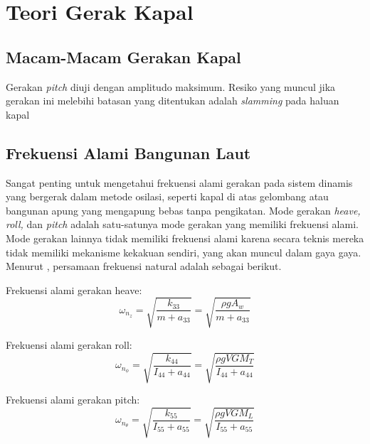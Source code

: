 \section{Teori Gerak Kapal}
\label{sec:teori-gerak-kapal}

\subsection{Macam-Macam Gerakan Kapal}
\label{subsec:macam-gerak-kapal}

Gerakan \emph{pitch} diuji dengan amplitudo maksimum. Resiko yang muncul jika gerakan ini melebihi batasan yang ditentukan adalah \emph{slamming} pada haluan kapal

\subsection{Frekuensi Alami Bangunan Laut}
\label{subsec:frekuensi-alami-kapal}

Sangat penting untuk mengetahui frekuensi alami gerakan pada sistem dinamis yang bergerak dalam metode osilasi, seperti kapal di atas gelombang atau bangunan apung yang mengapung bebas tanpa pengikatan. Mode gerakan \emph{heave, roll,} dan \textit{pitch} adalah satu-satunya mode gerakan yang memiliki frekuensi alami. Mode gerakan lainnya tidak memiliki frekuensi alami karena secara teknis mereka tidak memiliki mekanisme kekakuan sendiri, yang akan muncul dalam gaya gaya. Menurut \citep{Djatmiko_2012}, persamaan frekuensi natural adalah sebagai berikut.

Frekuensi alami gerakan heave:
\begin{equation}
    \omega_{n_z} = \sqrt{\frac{k_{33}}{m + a_{33}}} = \sqrt{\frac{\rho g A_w}{m + a_{33}}}
\label{eq:heave-alami}
\end{equation}

Frekuensi alami gerakan roll:
\begin{equation}
    \omega_{n_\phi} = \sqrt{\frac{k_{44}}{I_{44} + a_{44}}} = \sqrt{\frac{\rho g V GM_T}{I_{44} + a_{44}}}
\label{eq:roll-alami}
\end{equation}

Frekuensi alami gerakan pitch:
\begin{equation}
    \omega_{n_\theta} = \sqrt{\frac{k_{55}}{I_{55} + a_{55}}} = \sqrt{\frac{\rho g V GM_L}{I_{55} + a_{55}}}
\label{eq:pitch-alami}
\end{equation}

